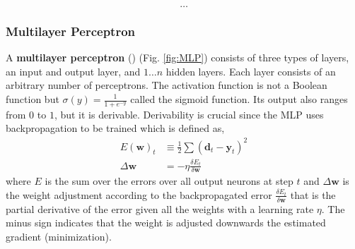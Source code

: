 \[\dots\]
\subsubsection{Multilayer Perceptron}\label{backpropa}
  A \textbf{multilayer perceptron} () (Fig. \ref{fig:MLP}) consists of three types of layers, an input and output layer, and $1 \dots n$ hidden layers.
  Each layer consists of an arbitrary number of perceptrons.
  The activation function is not a Boolean function but $\sigma(y) = \frac{1}{1+e^{-y}}$ called the sigmoid function.
  Its output also ranges from $0$ to $1$, but it is derivable.
  Derivability is crucial since the MLP uses backpropagation to be trained which is defined as,
  \begin{align}
    E(\mathbf{w})_t &\equiv \frac{1}{2} \sum (\mathbf{d}_t - \mathbf{y}_t)^2 \\
    \Delta \mathbf{w} &= - \eta \frac{\delta E_t}{\delta \mathbf{w}}
  \end{align}
  where $E$ is the sum over the errors over all output neurons at step $t$ and $\Delta \mathbf{w}$ is the weight adjustment according to the backpropagated error $\frac{\delta E_t}{\delta \mathbf{w}}$ that is the partial derivative of the error given all the weights with a learning rate $\eta$.
  The minus sign indicates that the weight is adjusted downwards the estimated gradient (minimization).


